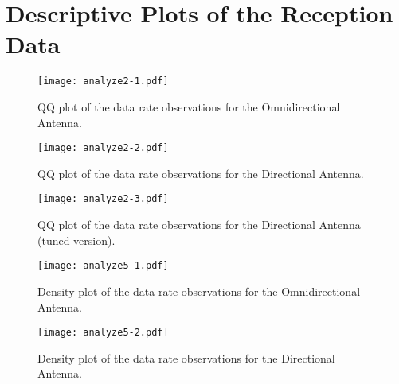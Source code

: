 
\newpage




\section{Descriptive Plots of the Reception Data}\label{plot-reception}



\begin{figure}[!htbp]
 \begin{center}
  \texttt{[image: analyze2-1.pdf]}
 \end{center}
 \caption{QQ plot of the data rate observations for the Omnidirectional Antenna.}
  \label{fig:cf21}
\end{figure}

\begin{figure}[!htbp]
 \begin{center}
  \texttt{[image: analyze2-2.pdf]}
 \end{center}
 \caption{QQ plot of the data rate observations for the Directional Antenna.}
  \label{fig:cf22}
\end{figure}

\begin{figure}[!htbp]
 \begin{center}
  \texttt{[image: analyze2-3.pdf]}
 \end{center}
 \caption{QQ plot of the data rate observations for the Directional Antenna (tuned version).}
  \label{fig:cf23}
\end{figure}

\newpage



\begin{figure}[!htbp]
 \begin{center}
  \texttt{[image: analyze5-1.pdf]}
 \end{center}
 \caption{Density plot of the data rate observations for the Omnidirectional Antenna.}
  \label{fig:cf51}
\end{figure}

\begin{figure}[!htbp]
 \begin{center}
  \texttt{[image: analyze5-2.pdf]}
 \end{center}
 \caption{Density plot of the data rate observations for the Directional Antenna.}
  \label{fig:cf52}
\end{figure}

